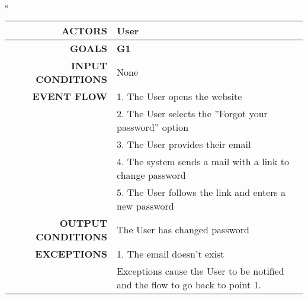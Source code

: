 s\begin{table}[h!]
\begin{tabular}{|r|p{3in}|}
\hline
\textbf{ACTORS} & User\\
\hline
\textbf{GOALS} & \textbf{G1} \\
\hline
\textbf{INPUT CONDITIONS} & None \\
\hline
\textbf{EVENT FLOW} 
&1. The User opens the website \\
&2. The User selects the ''Forgot your password'' option \\
&3. The User provides their email  \\
&4. The system sends a mail with a link to change password\\
&5. The User follows the link and enters a new password\\
\hline
\textbf{OUTPUT CONDITIONS} & The User has changed password\\
\hline
\textbf{EXCEPTIONS} 
&1. The email doesn't exist \\
&Exceptions cause the User to be notified and the flow to go back to point 1.\\
\hline
\end{tabular}
\end{table}